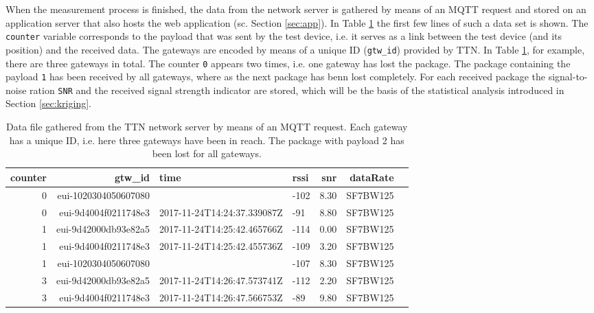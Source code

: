 When the measurement process is finished, the data from the network server is gathered by means of an MQTT request and stored on an application server that also hosts the web application (sc. Section \ref{sec:app}). In Table \ref{tab:ttn} the first few lines of such a data set is shown. The \texttt{counter} variable corresponds to the payload that was sent by the test device, i.e. it serves as a link between the test device (and its position) and the received data. The gateways are encoded by means of a unique ID (\texttt{gtw\_id}) provided by TTN. In Table \ref{tab:ttn}, for example, there are three gateways in total. The counter \texttt{0} appears two times, i.e. one gateway has lost the package. The package containing the payload \texttt{1} has been received by all gateways, where as the next package has benn lost completely. For each received package the signal-to-noise ration \texttt{SNR} and the received signal strength indicator  are stored, which will be the basis of the statistical analysis introduced in Section \ref{sec:kriging}.


\begin{table}[h!]
\centering
\begin{tabular}{rrllrrl}
  \hline
  counter &   gtw\_id & time & rssi & snr & dataRate \\ 
  \hline
     0 &   eui-1020304050607080 &  & -102 & 8.30 & SF7BW125 \\ 
     0 &   eui-9d4004f0211748e3 & 2017-11-24T14:24:37.339087Z & -91 & 8.80 & SF7BW125 \\ 
     1 &   eui-9d42000db93e82a5 & 2017-11-24T14:25:42.465766Z & -114 & 0.00 & SF7BW125 \\ 
     1 &   eui-9d4004f0211748e3 & 2017-11-24T14:25:42.455736Z & -109 & 3.20 & SF7BW125 \\ 
     1 &   eui-1020304050607080 &  & -107 & 8.30 & SF7BW125 \\ 
     3 &   eui-9d42000db93e82a5 & 2017-11-24T14:26:47.573741Z & -112 & 2.20 & SF7BW125 \\ 
     3 &   eui-9d4004f0211748e3 & 2017-11-24T14:26:47.566753Z & -89 & 9.80 & SF7BW125 \\ 
   \hline
\end{tabular}
\caption{Data file gathered from the TTN network server by means of an MQTT request. Each gateway has a unique ID, i.e. here three gateways have been in reach. The package with payload 2 has been lost for all gateways.}\label{tab:ttn}
\end{table}

